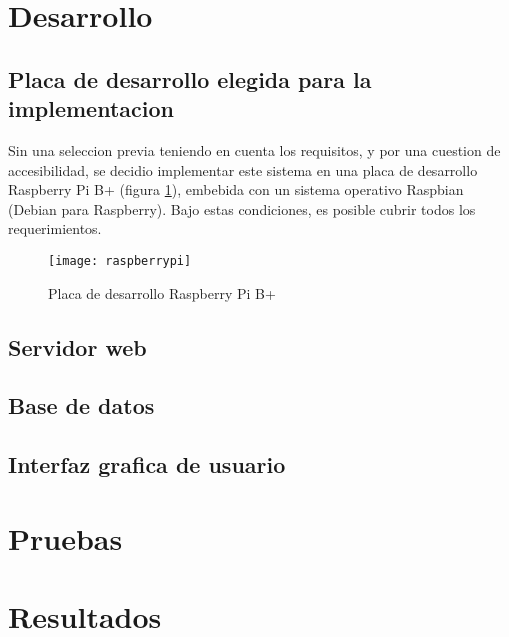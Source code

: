 
\section{Desarrollo} %
\label{sec:desarrollo}

\subsection{Placa de desarrollo elegida para la implementacion} %
\label{sub:placa_de_desarrollo_elegida_para_la_implementacion}

Sin una seleccion previa teniendo en cuenta los requisitos, y por una cuestion de accesibilidad, se decidio implementar este sistema en una placa de desarrollo Raspberry Pi B+ (figura \ref{fig:raspberrypi}), embebida con un sistema operativo Raspbian (Debian para Raspberry). Bajo estas condiciones, es posible cubrir todos los requerimientos.

\begin{figure}[h]
  \centering
  \texttt{[image: raspberrypi]}
  \caption{Placa de desarrollo Raspberry Pi B+}\label{fig:raspberrypi}
\end{figure}

\subsection{Servidor web} %
\label{sub:servidor_web}


\subsection{Base de datos} %
\label{sub:base_de_datos}


\subsection{Interfaz grafica de usuario} %
\label{sub:interfaz_grafica_de_usuario}



\section{Pruebas} %
\label{sec:pruebas}


\section{Resultados} %
\label{sec:resultados}


